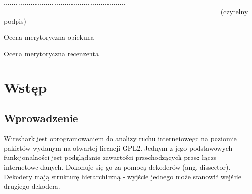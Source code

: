 \documentclass[a4paper, 12pt, twoside, openright]{article}
\begin{document}
\begin{center}

~~~~~~~~~~~~~~~~~~~~~~~~~~~~~~~~~~~~~~~~~~~~~~~~~~~~~~~~~~~~~~~~~ 
................................................................. \\
~~~~~~~~~~~~~~~~~~~~~~~~~~~~~~~~~~~~~~~~~~~~~~~~~~~~~~~~~~~~~~~  {\sf (czytelny podpis)} \\

\end{center}



\newpage
\linespread{1.3}
\selectfont

\hspace*{\fill}\large{Ocena merytoryczna opiekuna}

\vspace{85mm}

\newpage
\linespread{1.3}
\selectfont

\hspace*{\fill}\large{Ocena merytoryczna recenzenta}

\vspace{85mm}


\newpage
\tableofcontents


\newpage
\section{Wstęp}
\subsection{Wprowadzenie}
	\indent\par
	Wireshark jest oprogramowaniem do analizy ruchu internetowego na poziomie pakietów wydanym na otwartej licencji GPL2.
	Jednym z jego podstawowych funkcjonalności jest podglądanie zawartości przechodzących przez łącze internetowe danych.
	Dokonuje się go za pomocą dekoderów (ang. dissector). Dekodery mają strukturę hierarchiczną - wyjście jednego
	może stanowić wejście drugiego dekodera.
\end{document}
